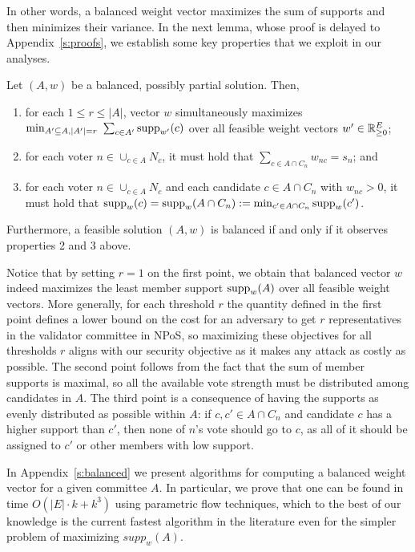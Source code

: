 In other words, a balanced weight vector maximizes the sum of supports and then minimizes their variance. 
In the next lemma, whose proof is delayed to Appendix~\ref{s:proofs}, we establish some key properties that we exploit in our analyses. 

\begin{lemma}\label{lem:balanced}
Let $(A,w)$ be a balanced, possibly partial solution. Then,
\begin{enumerate}
    \item for each $1\leq r\leq |A|$, vector $w$ simultaneously maximizes $\min_{A'\subseteq A, |A'|=r} \ \sum_{c\in A'} \operatorname{supp}_{w'}(c)$ over all feasible weight vectors $w'\in\mathbb{R}_{\geq 0}^E$; 
		\item for each voter $n\in \cup_{c\in A} N_c$, it must hold that $\sum_{c\in A\cap C_n} w_{nc}=s_n$; and
    \item for each voter $n\in \cup_{c\in A} N_c$ and each candidate $c\in A\cap C_n$ with $w_{nc} > 0$, it must hold that $\operatorname{supp}_w(c)=\operatorname{supp}_w(A\cap C_n):=\min_{c'\in A\cap C_n} \operatorname{supp}_w(c')$. 
\end{enumerate}
Furthermore, a feasible solution $(A,w)$ is balanced if and only if it observes properties 2 and 3 above.
\end{lemma}

Notice that by setting $r=1$ on the first point, we obtain that balanced vector $w$ indeed maximizes the least member support $\operatorname{supp}_w(A)$ over all feasible weight vectors. 
More generally, for each threshold $r$ the quantity defined in the first point defines a lower bound on the cost for an adversary to get $r$ representatives in the validator committee in NPoS, so maximizing these objectives for all thresholds $r$ aligns with our security objective as it makes any attack as costly as possible. 
The second point follows from the fact that the sum of member supports is maximal, so all the available vote strength must be distributed among candidates in $A$. 
The third point is a consequence of having the supports as evenly distributed as possible within $A$: if $c,c'\in A\cap C_n$ and candidate $c$ has a higher support than $c'$, then none of $n$'s vote should go to $c$, as all of it should be assigned to $c'$ or other members with low support. 

In Appendix~\ref{s:balanced} we present algorithms for computing a balanced weight vector for a given committee $A$. 
In particular, we prove that one can be found in time $O(|E|\cdot k + k^3)$ using parametric flow techniques, which to the best of our knowledge is the current fastest algorithm in the literature even for the simpler problem of maximizing $supp_w(A)$.

